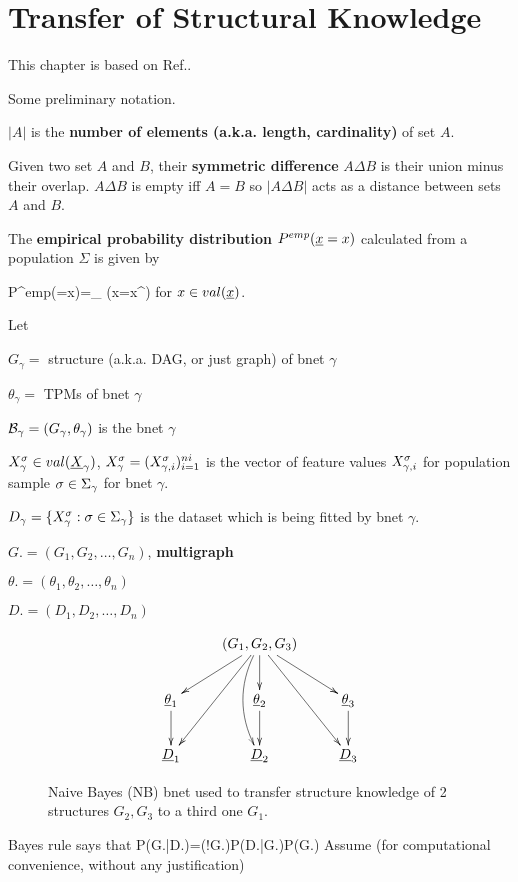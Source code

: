 \chapter{Transfer of Structural Knowledge}
\label{ch-transfer-struc}

This chapter is based on Ref.\cite{nic-transfer}.

Some preliminary notation.

$|A|$
is the {\bf number of elements (a.k.a. length, cardinality)} of set $A$.


Given two set $A$ and $B$, their 
{\bf symmetric difference} $A\Delta B$ is their union minus their overlap. $A\Delta B$ is empty iff $A=B$ so $|A\Delta B|$
acts as a distance between sets $A$ and $B$.

The {\bf empirical probability distribution} 
$P^{emp}(\rvx =x)$ calculated from a population $\Sigma$ is given by

\beq
P^{emp}(\rvx =x)=\sum_{\s\in \Sigma}
\indi(x=x^\s)
\eeq
for $x\in val(\rvx)$.


Let 

$G_\gamma=$ structure (a.k.a. DAG, or just graph)  of bnet $\gamma$

$\theta_\gamma=$ TPMs of bnet $\gamma$

${\cal B}_\gamma=(G_\gamma, \theta_\gamma)$ is the bnet $\gamma$

$X_\gamma^\s\in val(\rvX_\gamma)$, $X_\gamma^\sigma=(X_{\gamma, i}^\sigma)_{i=1}^{ni}$
is the vector of feature values 
$X_{\gamma, i}^\sigma$ for population sample $\sigma\in\Sigma_\gamma$ for bnet $\gamma$.



$D_\gamma=\{X^\sigma_\gamma:\sigma\in \Sigma_\gamma\}$ is the dataset which is being fitted by bnet $\gamma$. 

$G. = (G_1, G_2, \ldots, G_n)$, {\bf multigraph
}

$\theta. = (\theta_1, \theta_2, \ldots, \theta_n)$

$D. = (D_1, D_2, \ldots, D_n)$

\begin{figure}[h!]
$$\xymatrix
{
&(G_1, G_2, G_3)\ar[dl]\ar[d]\ar[dr]
\ar[ddl]\ar[ddr]\ar@/_1pc/[dd]
\\
\rvtheta_1\ar[d]
&\rvtheta_2\ar[d]
&\rvtheta_3\ar[d]
\\
\rvD_1
&\rvD_2
&\rvD_3
}$$
\caption{Naive Bayes (NB) bnet used to  transfer structure knowledge of 2 structures $G_2, G_3$ to a third one $G_1$.}
\label{fig-bnet-transfer-struc}
\end{figure}
Bayes rule says that
\beq
P(G.|D.)=\caln(!G.)P(D.|G.)P(G.)
\eeq
Assume (for computational convenience, without any justification)


